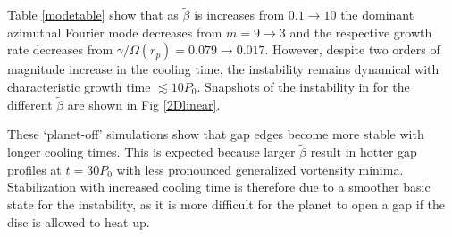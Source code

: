 
Table \ref{modetable} show that as
$\tilde{\beta}$ is increases from $ 0.1\rightarrow10$ the dominant
azimuthal Fourier mode decreases from $ m=9\rightarrow3$ and the
respective growth rate decreases from $ \gamma/\Omega(r_p)=0.079
\rightarrow 0.017$. However, despite two orders of magnitude increase in the
cooling time, the instability remains dynamical with characteristic  growth time
$\lesssim 10P_0$. Snapshots of the instability in for  
the different $\tilde\beta$ are shown in Fig \ref{2Dlinear}. 

These `planet-off' simulations show that gap edges become more stable with
longer cooling times. This is expected because larger $\tilde{\beta}$
result in hotter gap profiles at $t=30P_0$ with less pronounced
generalized vortensity minima. Stabilization with increased
cooling time is therefore due to a smoother basic state for the
instability, as it is more difficult for the planet to open a gap if
the disc is allowed to heat up. 
 


